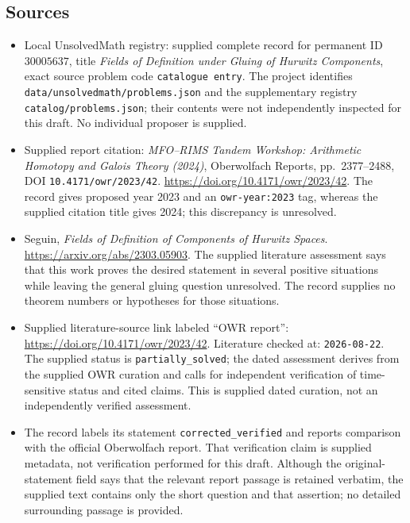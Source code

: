 \documentclass[11pt]{article}
\begin{document}
\subsection{Sources}
\begin{itemize}
\item Local UnsolvedMath registry: supplied complete record for permanent ID \(30005637\), title \emph{Fields of Definition under Gluing of Hurwitz Components}, exact source problem code \texttt{catalogue entry}. The project identifies \texttt{data/unsolvedmath/problems.json} and the supplementary registry \texttt{catalog/problems.json}; their contents were not independently inspected for this draft. No individual proposer is supplied.
\item Supplied report citation: \emph{MFO--RIMS Tandem Workshop: Arithmetic Homotopy and Galois Theory (2024)}, Oberwolfach Reports, pp.~2377--2488, DOI \texttt{10.4171/owr/2023/42}. \url{https://doi.org/10.4171/owr/2023/42}. The record gives proposed year 2023 and an \texttt{owr-year:2023} tag, whereas the supplied citation title gives 2024; this discrepancy is unresolved.
\item Seguin, \emph{Fields of Definition of Components of Hurwitz Spaces}. \url{https://arxiv.org/abs/2303.05903}. The supplied literature assessment says that this work proves the desired statement in several positive situations while leaving the general gluing question unresolved. The record supplies no theorem numbers or hypotheses for those situations.
\item Supplied literature-source link labeled ``OWR report'': \url{https://doi.org/10.4171/owr/2023/42}. Literature checked at: \texttt{2026-08-22}. The supplied status is \texttt{partially\_solved}; the dated assessment derives from the supplied OWR curation and calls for independent verification of time-sensitive status and cited claims. This is supplied dated curation, not an independently verified assessment.
\item The record labels its statement \texttt{corrected\_verified} and reports comparison with the official Oberwolfach report. That verification claim is supplied metadata, not verification performed for this draft. Although the original-statement field says that the relevant report passage is retained verbatim, the supplied text contains only the short question and that assertion; no detailed surrounding passage is provided.
\end{itemize}
\end{document}
